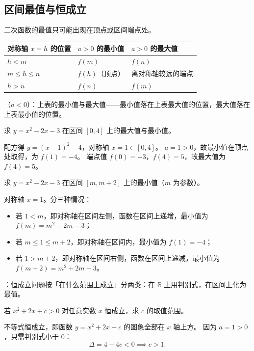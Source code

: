 \begin{procedure}
\section{区间最值与恒成立}
二次函数的最值只可能出现在顶点或区间端点处。

\begin{center}
\footnotesize
\setlength{\tabcolsep}{3pt}
\renewcommand{\arraystretch}{1.5}
\begin{tabular}{p{3.2cm}p{4.4cm}p{4.4cm}}
\toprule
对称轴 $x=h$ 的位置 & $a>0$ 的最小值 & $a>0$ 的最大值 \\
\midrule
$h<m$ & $f(m)$ & $f(n)$ \\
$m\leq h\leq n$ & $f(h)$（顶点） & 离对称轴较远的端点 \\
$h>n$ & $f(n)$ & $f(m)$ \\
\bottomrule
\end{tabular}
\end{center}

（$a<0$）：上表的最小值与最大值——最小值落在上表最大值的位置，最大值落在上表最小值的位置。

\begin{example}
求 $y=x^2-2x-3$ 在区间 $[0,4]$ 上的最大值与最小值。
\end{example}
\begin{solution}
配方得 $y=(x-1)^2-4$，对称轴 $x=1\in[0,4]$。
$a=1>0$，故最小值在顶点处取得，为 $f(1)=-4$。
端点值 $f(0)=-3$，$f(4)=5$，故最大值为 $f(4)=5$。
\end{solution}

\begin{example}
求 $y=x^2-2x-3$ 在区间 $[m,m+2]$ 上的最小值（$m$ 为参数）。
\end{example}
\begin{solution}
对称轴 $x=1$。分三种情况：
\begin{itemize}
  \item 若 $1<m$，即对称轴在区间左侧，函数在区间上递增，最小值为 $f(m)=m^2-2m-3$；
  \item 若 $m\leq1\leq m+2$，即对称轴在区间内，最小值为 $f(1)=-4$；
  \item 若 $1>m+2$，即对称轴在区间右侧，函数在区间上递减，最小值为 $f(m+2)=m^2+2m-3$。
\end{itemize}
\end{solution}

：恒成立问题按「在什么范围上成立」分两类：在 $\mathbb{R}$ 上用判别式，在区间上化为最值。

\begin{example}
若 $x^2+2x+c>0$ 对任意实数 $x$ 恒成立，求 $c$ 的取值范围。
\end{example}
\begin{solution}
不等式恒成立，即函数 $y=x^2+2x+c$ 的图象全部在 $x$ 轴上方。
因为 $a=1>0$，只需判别式小于 $0$：
\[
  \Delta=4-4c<0\implies c>1.
\]
\end{solution}


\end{procedure}
